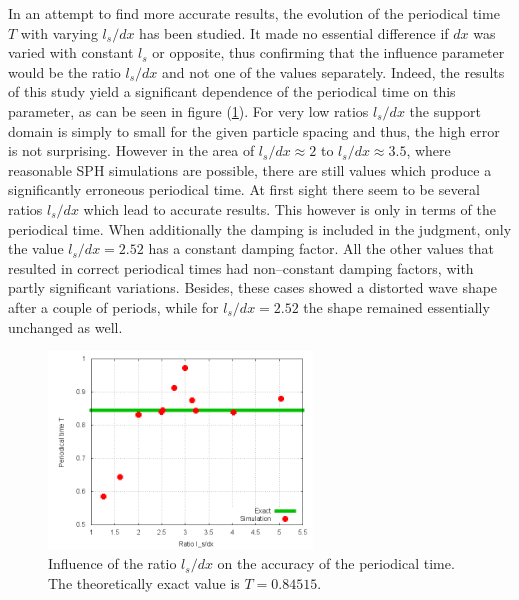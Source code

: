 \documentclass[11pt,a4paper,twoside]{report}
\begin{document}
In an attempt to find more accurate results, the evolution of the periodical time $T$ with varying $l_s/dx$ has been studied. It made no essential difference if $dx$ was varied with constant $l_s$ or opposite, thus confirming that the influence parameter would be the ratio $l_s/dx$ and not one of the values separately. Indeed, the results of this study yield a significant dependence of the periodical time on this parameter, as can be seen in figure (\ref{fig:Results_1DoscillatingWave_T_versus_ls/dx}). For very low ratios $l_s/dx$ the support domain is simply to small for the given particle spacing and thus, the high error is not surprising. However in the area of $l_s/dx\approx2$ to $l_s/dx\approx3.5$, where reasonable SPH simulations are possible, there are still values which produce a significantly erroneous periodical time. 
At first sight there seem to be several ratios $l_s/dx$ which lead to accurate results. This however is only in terms of the periodical time. When additionally the damping is included in the judgment, only the value $l_s/dx=2.52$ has a constant damping factor. All the other values that resulted in correct periodical times had non--constant damping factors, with partly significant variations. Besides, these cases showed a distorted wave shape %
after a couple of periods, while for $l_s/dx=2.52$ the shape remained essentially unchanged as well. 



\begin{figure}[h]
 \label{fig:Results_1DoscillatingWave_T_versus_ls/dx}
\centering

\includegraphics[width=7cm]{Graphics/results/1DWave/Oscillation/suplen_influence}

\caption[1D Oscillation: periodical time versus $l_s/dx$]{Influence of the ratio $l_s/dx$ on the accuracy of the periodical time. The theoretically exact value %
is $T=0.84515$. %
}

\end{figure}
\end{document}
